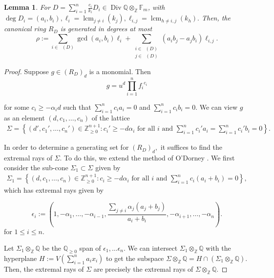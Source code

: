 \documentclass{amsart}
\theoremstyle{plain}
\newtheorem{lem}[thm]{Lemma}
\theoremstyle{definition}
\theoremstyle{remark}
\numberwithin{equation}{section}
\newcommand\bq{{\mathbb Q}}
\newcommand\bz{{\mathbb Z}}
\DeclareMathOperator\di{Div}
\newcommand\bida{a}
\newcommand\bidb{b}
\newcommand\hirz{\mathbb{F}}
\DeclareMathOperator{\Te}{T_=}
\DeclareMathOperator{\Tp}{T_+}
\DeclareMathOperator{\Tm}{T_-}
\DeclareMathOperator{\lcm}{lcm}
\begin{document}
\begin{lem}
\label{lem:hirz-generators}
For $D = \sum_{i=1}^{n} \frac{c_i}{k_i}D_i \in \di \bq \otimes_\bz \hirz_m$, with $\deg D_i = (\bida_i, \bidb_i), \ell_i = \lcm_{j\neq i} (k_j), \ell_{i,j} = \lcm_{h \neq i,j} (k_h).$ Then, the canonical ring $R_D$ is generated in degrees at most
\begin{equation}\label{eqn:def-sigma}
	\rho := \sum_{i \in \Te(D)} \gcd(\bida_i, \bidb_i) \ell_i + \sum_{\substack
	{i \in \Tp(D) \\ j\in \Tm(D)}} (\bida_i \bidb_j - \bida_j \bidb_i)
	\ell	_{i,j}.
\end{equation}
\end{lem}

\begin{proof}
Suppose $g
\in (R_D)_d$ is a monomial.
 Then 
\[
	g = u^d \prod_{i = 1}^n {f_i}^{c_i}
\]

\noindent
for some $c_i \ge - \alpha_i d$ such that $\sum_{i=1}^n c_i \bida_i = 0$
and $\sum_{i=1}^n c_i \bidb_i = 0$. We can view $g$ as an element $(d, c_1, \ldots, c_n)$ of the
lattice 
\begin{align*}
	\Sigma = \left\{ (d', c_1', \ldots, c_n') \in \bz_{\geq 0}^{n+1} \colon c_i' \ge - d
\alpha_i \text{ for all }i \text{ and }\sum_{i=1}^n c_i' \bida_i = \sum_{i =
1}^n c_i' \bidb_i = 0 \right \}.	
\end{align*}

In order to determine a generating
set for $(R_D)_d,$ it suffices to find the extremal rays of $\Sigma.$
To do this, we extend the method of O'Dorney \cite[Theorem 8]{dorney:canonical}. 
We first consider the sub-cone $\Sigma_1 \subset \Sigma$
given by
\begin{align*}
	\Sigma_1 = \left\{ (d, c_1, \ldots, c_n) \in \bz_{\geq 0}^{n+1} \colon c_i \ge -
d \alpha_i \text{ for all }i \text{ and }\sum_{i=1}^n c_i (\bida_i+\bidb_i) = 0
\right\},
\end{align*}
which
has extremal rays given by
 
\[
	\epsilon_i := \left(1, -\alpha_1, \ldots, -\alpha_{i-1}, \frac{\sum_{j \ne i}
	\alpha_j (\bida_j + \bidb_j)}{\bida_i + \bidb_i}, -\alpha_{i + 1},
	\ldots, -\alpha_n \right).
\]
for $1 \leq i \leq n$.

Let $\Sigma_1 \otimes_\bz \bq$ be the $\bq_{\ge 0}$ span of $\epsilon_1, \ldots \epsilon_n$.
We can intersect $\Sigma_1 \otimes_\bz \bq$ with the hyperplane $H :=
V(\sum_{i=1}^n \bida_i x_i)$  to get the subspace $\Sigma \otimes_\bz \bq = H \cap (\Sigma_1
\otimes_\bz \bq)$.  Then, the extremal rays of $\Sigma$ are precisely the extremal 
rays of $\Sigma \otimes_\bz \bq$.


\end{proof}
\end{document}
